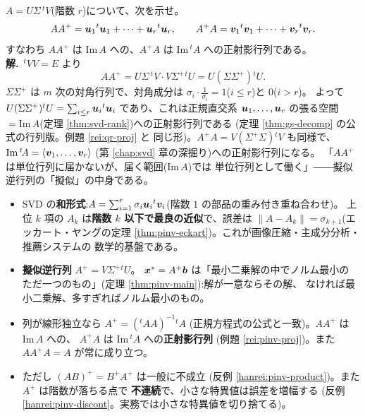 \begin{rei}[例題・標準(証明:$AA^{+}$ と $A^{+}A$ は正射影行列)]\label{rei:pinv-proj}
$A = U\Sigma\,{}^tV$(階数 $r$)について、次を示せ。
\[
AA^{+} = \bm{u}_1{}^t\bm{u}_1 + \cdots + \bm{u}_r{}^t\bm{u}_r,
\qquad
A^{+}A = \bm{v}_1{}^t\bm{v}_1 + \cdots + \bm{v}_r{}^t\bm{v}_r.
\]
すなわち $AA^{+}$ は $\mathrm{Im}\,A$ への、$A^{+}A$ は
$\mathrm{Im}\,{}^t\!A$ への正射影行列である。\\
\textbf{解.}\ ${}^tVV = E$ より
\[
AA^{+} = U\Sigma\,{}^tV \cdot V\Sigma^{+}{}^tU = U(\Sigma\Sigma^{+}){}^tU.
\]
$\Sigma\Sigma^{+}$ は $m$ 次の対角行列で、対角成分は
$\sigma_i \cdot \frac{1}{\sigma_i} = 1$($i \le r$)と $0$($i > r$)。
よって $U(\Sigma\Sigma^{+}){}^tU = \sum_{i \le r}\bm{u}_i{}^t\bm{u}_i$
であり、これは正規直交系 $\bm{u}_1, \dots, \bm{u}_r$ の張る空間
$= \mathrm{Im}\,A$(定理 \ref{thm:svd-rank})への正射影行列である
(定理 \ref{thm:gs-decomp} の公式の行列版。例題 \ref{rei:qr-proj} と
同じ形)。$A^{+}A = V(\Sigma^{+}\Sigma){}^tV$ も同様で、
$\mathrm{Im}\,{}^t\!A = \langle \bm{v}_1, \dots, \bm{v}_r \rangle$
(第 \ref{chap:svd} 章の深掘り)への正射影行列になる。
「$AA^{+}$ は単位行列に届かないが、届く範囲($\mathrm{Im}\,A$)では
単位行列として働く」――擬似逆行列の「擬似」の中身である。
\end{rei}

\begin{matome}
\begin{itemize}
\item SVD の\textbf{和形式}:$A = \sum_{i=1}^{r}\sigma_i\bm{u}_i
{}^t\bm{v}_i$(階数 $1$ の部品の重み付き重ね合わせ)。
上位 $k$ 項の $A_k$ は\textbf{階数 $k$ 以下で最良の近似}で、誤差は
$\|A - A_k\| = \sigma_{k+1}$(エッカート・ヤングの定理
\ref{thm:pinv-eckart})。これが画像圧縮・主成分分析・推薦システムの
数学的基盤である。
\item \textbf{擬似逆行列} $A^{+} = V\Sigma^{+}{}^tU$。
$\bm{x}^* = A^{+}\bm{b}$ は「最小二乗解の中でノルム最小の
ただ一つのもの」(定理 \ref{thm:pinv-main}):解が一意ならその解、
なければ最小二乗解、多すぎればノルム最小のもの。
\item 列が線形独立なら $A^{+} = ({}^t\!AA)^{-1}{}^t\!A$
(正規方程式の公式と一致)。$AA^{+}$ は $\mathrm{Im}\,A$ への、
$A^{+}A$ は $\mathrm{Im}\,{}^t\!A$ への\textbf{正射影行列}
(例題 \ref{rei:pinv-proj})。また $AA^{+}A = A$ が常に成り立つ。
\item ただし $(AB)^{+} = B^{+}A^{+}$ は一般に不成立
(反例 \ref{hanrei:pinv-product})。また $A^{+}$ は階数が落ちる点で
\textbf{不連続}で、小さな特異値は誤差を増幅する
(反例 \ref{hanrei:pinv-discont}。実務では小さな特異値を切り捨てる)。
\end{itemize}
\end{matome}

